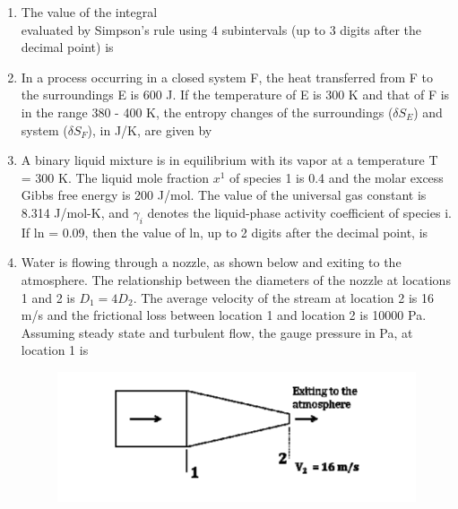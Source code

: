 \documentclass[journal,12pt,onecolumn]{IEEEtran}
\theoremstyle{remark}
\begin{document}
\begin{enumerate}
 \item The value of the integral \\

 evaluated by Simpson’s rule using 4 subintervals (up to 3 digits after the decimal point) is \underline{\hspace{2cm}}
 
 \item In a process occurring in a closed system F, the heat transferred from F to the surroundings E is
 600 J. If the temperature of E is 300 K and that of F is in the range 380 - 400 K, the entropy
 changes of the surroundings ($\delta S_E$) and system ($\delta S_F$), in J/K, are given by
                    \begin{enumerate}
                    	\begin{multicols}{2}
 	\item  $\Delta_E = 2$, $\Delta_F = -2$
 	\item  $\Delta_E = -2$, $\Delta_F = 2$
 	\item  $\Delta_E = 2$, $\Delta_F = -2$
 	\item  $\Delta_E = 2$, $\Delta_F = -2$
 \end{multicols}
 \end{enumerate}
 
 \item A binary liquid mixture is in equilibrium with its vapor at a temperature T = 300 K. The liquid
 mole fraction $x^1$ of species 1 is 0.4 and the molar excess Gibbs free energy is 200 J/mol. The value
 of the universal gas constant is 8.314 J/mol-K, and $\gamma_i$ denotes the liquid-phase activity coefficient of
 species i. If ln = 0.09, then the value of ln, up to 2 digits after the decimal point, is  \underline{\hspace{2cm}}
 
 \item Water  is flowing through a nozzle, as shown below and exiting to the
 atmosphere. The relationship between the diameters of the nozzle at locations 1 and 2 is $D_1 = 4 D_2$.
 The average velocity of the stream at location 2 is 16 m/s and the frictional loss between location 1
 and location 2 is 10000 Pa. Assuming steady state and turbulent flow, the gauge pressure in Pa, at
 location 1 is  \underline{\hspace{2cm}}
 
 \begin{figure}[H]
 	\centering
 	\includegraphics[width = 0.8\columnwidth]{q32.png}
 	\caption*{}
 	\label{fig:q32}
 \end{figure}
 

\end{enumerate}
\end{document}
